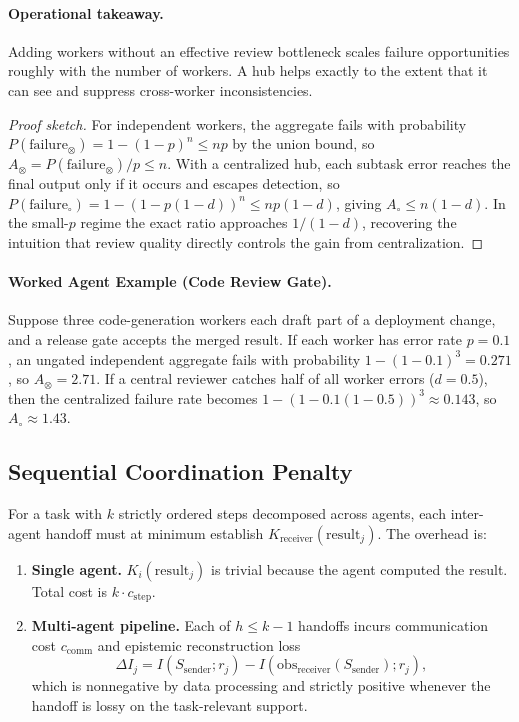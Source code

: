 \paragraph{Operational takeaway.}
Adding workers without an effective review bottleneck scales failure opportunities roughly with the number
of workers. A hub helps exactly to the extent that it can see and suppress cross-worker inconsistencies.

\begin{proof}[Proof sketch]
For independent workers, the aggregate fails with probability
$P(\mathrm{failure}_{\otimes}) = 1 - (1-p)^n \le np$ by the union bound, so
$A_{\otimes} = P(\mathrm{failure}_{\otimes})/p \le n$. With a centralized hub, each subtask error reaches
the final output only if it occurs and escapes detection, so
$P(\mathrm{failure}_{\circ}) = 1 - (1-p(1-d))^n \le np(1-d)$, giving
$A_{\circ} \le n(1-d)$. In the small-$p$ regime the exact ratio approaches $1/(1-d)$, recovering the
intuition that review quality directly controls the gain from centralization.
\end{proof}

\paragraph{Worked Agent Example (Code Review Gate).}
Suppose three code-generation workers each draft part of a deployment change, and a release gate accepts
the merged result. If each worker has error rate $p=0.1$, an ungated independent aggregate fails with
probability $1-(1-0.1)^3 = 0.271$, so $A_{\otimes}=2.71$. If a central reviewer catches half of all
worker errors ($d=0.5$), then the centralized failure rate becomes
$1-(1-0.1(1-0.5))^3 \approx 0.143$, so $A_{\circ}\approx 1.43$.

\subsection{Sequential Coordination Penalty}

\begin{theorem}
\label{thm:sequential-penalty}
For a task with $k$ strictly ordered steps decomposed across agents, each inter-agent handoff must at
minimum establish $K_{\mathrm{receiver}}(\mathrm{result}_j)$. The overhead is:
\begin{enumerate}[leftmargin=*]
\item[(a)] \textbf{Single agent.} $K_i(\mathrm{result}_j)$ is trivial because the agent computed the result.
Total cost is $k \cdot c_{\mathrm{step}}$.
\item[(b)] \textbf{Multi-agent pipeline.} Each of $h \le k-1$ handoffs incurs communication cost
$c_{\mathrm{comm}}$ and epistemic reconstruction loss
\begin{equation}
\Delta I_j = I(S_{\mathrm{sender}}; r_j) - I(\mathrm{obs}_{\mathrm{receiver}}(S_{\mathrm{sender}}); r_j),
\label{eq:epistemic-reconstruction-loss}
\end{equation}
which is nonnegative by data processing and strictly positive whenever the handoff is lossy on the
task-relevant support.
\end{enumerate}
\end{theorem}


